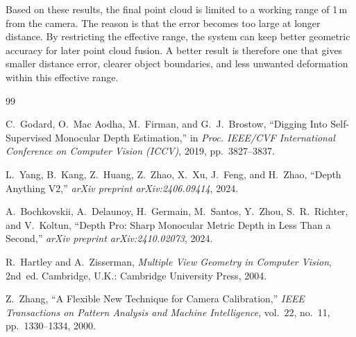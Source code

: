 \documentclass{article}
\begin{document}
Based on these results, the final point cloud is limited to a working range of 1\,m from the camera. The reason is that the error becomes too large at longer distance. By restricting the effective range, the system can keep better geometric accuracy for later point cloud fusion. A better result is therefore one that gives smaller distance error, clearer object boundaries, and less unwanted deformation within this effective range.

\FloatBarrier



\begin{thebibliography}{99}

C.~Godard, O.~Mac Aodha, M.~Firman, and G.~J.~Brostow,
``Digging Into Self-Supervised Monocular Depth Estimation,''
in \emph{Proc. IEEE/CVF International Conference on Computer Vision (ICCV)}, 2019, pp.~3827--3837.

L.~Yang, B.~Kang, Z.~Huang, Z.~Zhao, X.~Xu, J.~Feng, and H.~Zhao,
``Depth Anything V2,''
\emph{arXiv preprint arXiv:2406.09414}, 2024.

A.~Bochkovskii, A.~Delaunoy, H.~Germain, M.~Santos, Y.~Zhou, S.~R.~Richter, and V.~Koltun,
``Depth Pro: Sharp Monocular Metric Depth in Less Than a Second,''
\emph{arXiv preprint arXiv:2410.02073}, 2024.

R.~Hartley and A.~Zisserman,
\emph{Multiple View Geometry in Computer Vision}, 2nd~ed.
Cambridge, U.K.: Cambridge University Press, 2004.

Z.~Zhang,
``A Flexible New Technique for Camera Calibration,''
\emph{IEEE Transactions on Pattern Analysis and Machine Intelligence},
vol.~22, no.~11, pp.~1330--1334, 2000.

\end{thebibliography}
\end{document}
